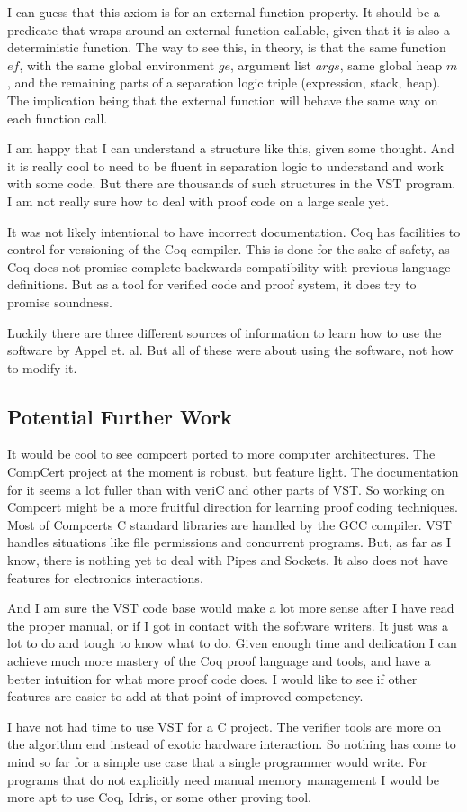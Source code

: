 I can guess that this axiom is for an external function property. It should be a predicate that wraps around an external function callable, given that it is also a deterministic function. The way to see this, in theory, is that the same function $ef$, with the same global environment $ge$, argument list $args$, same global heap $m$, and the remaining parts of a separation logic triple (expression, stack, heap). The implication being that the external function will behave the same way on each function call.

I am happy that I can understand a structure like this, given some thought. And it is really cool to need to be fluent in separation logic to understand and work with some code. But there are thousands of such structures in the VST program. I am not really sure how to deal with proof code on a large scale yet.

It was not likely intentional to have incorrect documentation. Coq has facilities to control for versioning of the Coq compiler. This is done for the sake of safety, as Coq does not promise complete backwards compatibility with previous language definitions. But as a tool for verified code and proof system, it does try to promise soundness. 

Luckily there are three different sources of information to learn how to use the software by Appel et. al. \cite{hutchison_verified_2012,appel_program_2014,noauthor_verifiable_nodate-3} But all of these were about using the software, not how to modify it. 



\subsection{Potential Further Work}

It would be cool to see compcert ported to more computer architectures. The CompCert project at the moment is robust, but feature light. The documentation for it seems a lot fuller than with veriC and other parts of VST. So working on Compcert might be a more fruitful direction for learning proof coding techniques. Most of Compcerts C standard libraries are handled by the GCC compiler. VST handles situations like file permissions and concurrent programs. But, as far as I know, there is nothing yet to deal with Pipes and Sockets. It also does not have features for electronics interactions.

And I am sure the VST code base would make a lot more sense after I have read the proper manual, or if I got in contact with the software writers. It just was a lot to do and tough to know what to do. Given enough time and dedication I can achieve much more mastery of the Coq proof language and tools, and have a better intuition for what more proof code does. I would like to see if other features are easier to add at that point of improved competency.

I have not had time to use VST for a C project. The verifier tools are more on the algorithm end instead of exotic hardware interaction. So nothing has come to mind so far for a simple use case that a single programmer would write. For programs that do not explicitly need manual memory management I would be more apt to use Coq, Idris, or some other proving tool.
